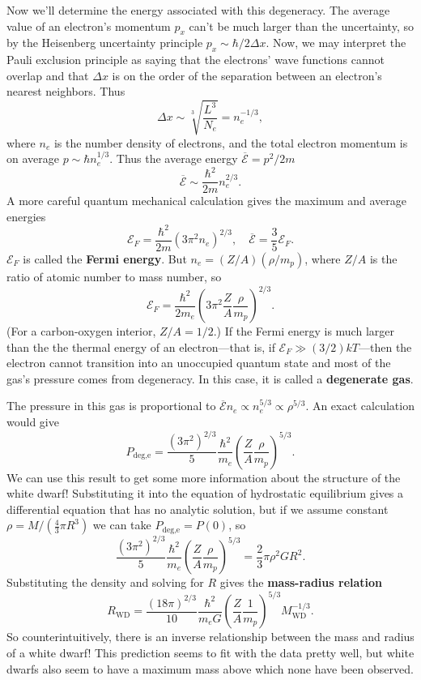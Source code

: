 \documentclass[../a062main.tex]{subfiles}
\begin{document}
Now we'll determine the energy associated with this degeneracy.
The average value of an electron's momentum $p_x$ can't be much larger than the uncertainty, so by the Heisenberg uncertainty principle $p_x \sim \hbar / 2 \Delta x$.
Now, we may interpret the Pauli exclusion principle as saying that the electrons' wave functions cannot overlap and that $\Delta x$ is on the order of the separation between an electron's nearest neighbors.
Thus
\[ \Delta x \sim \sqrt[3]{\frac{L^3}{N_e}} = n_e^{-1 / 3}, \]
where $n_e$ is the number density of electrons, and the total electron momentum is on average $p \sim \hbar n_e^{1 / 3}$.
Thus the average energy $\overline{\mathcal{E}} = p^2 / 2m$
\[ \boxed{\overline{\mathcal{E}} \sim \frac{\hbar^2}{2m} n_e^{2 / 3}}. \]
A more careful quantum mechanical calculation gives the maximum and average energies
\[ \mathcal{E}_F = \frac{\hbar^2}{2m} \left( 3\pi^2 n_e \right)^{2 / 3}, \quad \overline{\mathcal{E}} = \frac{3}{5} \mathcal{E}_F. \]
$\mathcal{E}_F$ is called the \textbf{Fermi energy}.
But $n_e = (Z / A)(\rho / m_p)$, where $Z / A$ is the ratio of atomic number to mass number, so
\[ \mathcal{E}_F = \frac{\hbar^2}{2m_e} \left( 3\pi^2 \frac{Z}{A} \frac{\rho}{m_p} \right)^{2 / 3}. \]
(For a carbon-oxygen interior, $Z / A = 1 / 2$.)
If the Fermi energy is much larger than the the thermal energy of an electron---that is, if $\mathcal{E}_F \gg (3 / 2) kT$---then the electron cannot transition into an unoccupied quantum state and most of the gas's pressure comes from degeneracy.
In this case, it is called a \textbf{degenerate gas}.

The pressure in this gas is proportional to $\overline{\mathcal{E}} n_e \propto n_e^{5 / 3}\propto \rho^{5 / 3}$.
An exact calculation would give
\[ \boxed{P_\textrm{deg,e} = \frac{(3\pi^2)^{2 / 3}}{5} \frac{\hbar^2}{m_e} \left( \frac{Z}{A} \frac{\rho}{m_p} \right)^{5 / 3}}. \]
We can use this result to get some more information about the structure of the white dwarf!
Substituting it into the equation of hydrostatic equilibrium gives a differential equation that has no analytic solution, but if we assume constant $\rho = M / (\frac{4}{3}\pi R^3)$ we can take $P_\textrm{deg,e} = P(0)$, so
\[ \frac{(3\pi^2)^{2 / 3}}{5} \frac{\hbar^2}{m_e} \left( \frac{Z}{A} \frac{\rho}{m_p} \right)^{5 / 3} = \frac{2}{3} \pi \rho^2 G R^2. \]
Substituting the density and solving for $R$ gives the \textbf{mass-radius relation}
\[ \boxed{R_\textrm{WD} = \frac{(18\pi)^{2 / 3}}{10} \frac{\hbar^2}{m_e G} \left( \frac{Z}{A} \frac{1}{m_p} \right)^{5 / 3} M_\textrm{WD}^{-1 / 3}}. \]
So counterintuitively, there is an inverse relationship between the mass and radius of a white dwarf!
This prediction seems to fit with the data pretty well, but white dwarfs also seem to have a maximum mass above which none have been observed.
\end{document}

